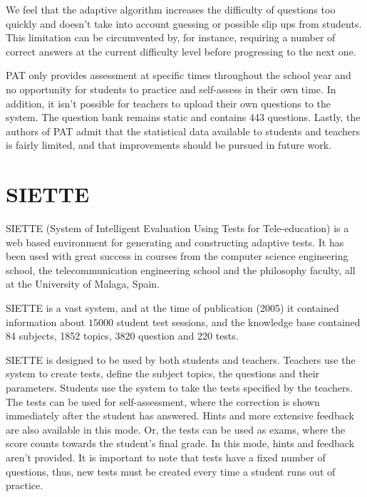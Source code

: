 We feel that the adaptive algorithm increases the difficulty of questions too quickly and doesn't take into account guessing or possible slip ups from students. This limitation can be circumvented by, for instance, requiring a number of correct answers at the current difficulty level before progressing to the next one.\newline

PAT only provides assessment at specific times throughout the school year and no opportunity for students to practice and self-assess in their own time. In addition, it isn't possible for teachers to upload their own questions to the system. The question bank remains static and contains 443 questions. Lastly, the authors of PAT admit that the statistical data available to students and teachers is fairly limited, and that improvements should be pursued in future work.

\section{SIETTE}
\label{sec:SIETTE}
SIETTE\cite{SIETTE-small} (System of Intelligent Evaluation Using Tests for Tele-education) is a web based environment for generating and constructing adaptive tests. It has been used with great success in courses from the computer science engineering school, the telecommunication engineering school and the philosophy faculty, all at the University of Malaga, Spain.\newline

SIETTE is a vast system, and at the time of publication (2005) it contained information about $15000$ student test sessions, and the knowledge base contained 84 subjects, 1852 topics, 3820 question and 220 tests.\newline

SIETTE is designed to be used by both students and teachers. Teachers use the system to create tests, define the subject topics, the questions and their parameters. Students use the system to take the tests specified by the teachers. The tests can be used for self-assessment, where the correction is shown immediately after the student has answered. Hints and more extensive feedback are also available in this mode. Or, the tests can be used as exams, where the score counts towards the student's final grade. In this mode, hints and feedback aren't provided. It is important to note that tests have a fixed number of questions, thus, new tests must be created every time a student runs out of practice.\newline

